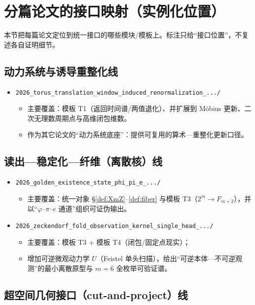\section{分篇论文的接口映射（实例化位置）}

本节把每篇论文定位到统一接口的哪些模块/模板上。标注只给“接口位置”，不复述各自证明细节。

\subsection{动力系统与诱导重整化线}

\begin{itemize}
  \item \texttt{2026\_torus\_translation\_window\_induced\_renormalization\_.../}
  \begin{itemize}
    \item 主要覆盖：模板 T1（返回时间谱/两值退化）、并扩展到 Möbius 更新、二次无理数周期点与高维闭包维数。
    \item 作为其它论文的“动力系统底座”：提供可复用的算术—重整化更新口径。
  \end{itemize}
\end{itemize}

\subsection{读出—稳定化—纤维（离散核）线}

\begin{itemize}
  \item \texttt{2026\_golden\_existence\_state\_phi\_pi\_e\_.../}
  \begin{itemize}
    \item 主要覆盖：统一对象 \S\ref{def:XmZ}--\ref{def:fiber} 与模板 T3（$2^m\to F_{m+2}$），并以“$\varphi$--$\pi$--$e$ 通道”组织可证伪输出。
  \end{itemize}

  \item \texttt{2026\_zeckendorf\_fold\_observation\_kernel\_single\_head\_.../}
  \begin{itemize}
    \item 主要覆盖：模板 T3 + 模板 T4（闭包/固定点现实）；
    \item 增加可逆微观动力学 $U$（Feistel 单头扫描），给出“可逆本体—不可逆观测”的最小离散原型与 $m=6$ 全枚举可验证谱。
  \end{itemize}
\end{itemize}

\subsection{超空间几何接口（cut-and-project）线}

